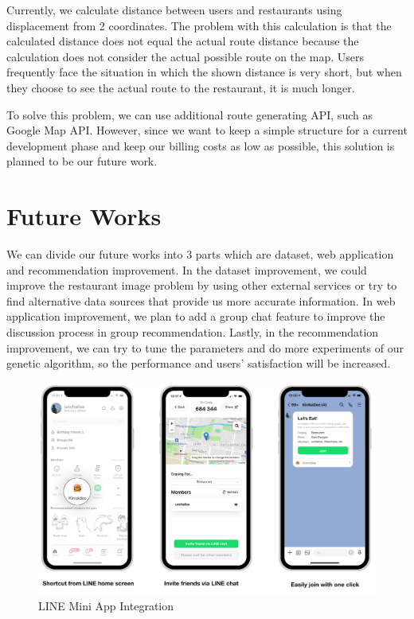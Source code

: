\documentclass[12pt,oneside,openright,a4paper]{cpe-english-project}
\begin{document}
Currently, we calculate distance between users and restaurants using displacement from 2 coordinates. The problem with this calculation is that the calculated distance does not equal the actual route distance because the calculation does not consider the actual possible route on the map. Users frequently face the situation in which the shown distance is very short, but when they choose to see the actual route to the restaurant, it is much longer.

To solve this problem, we can use additional route generating API, such as Google Map API. However, since we want to keep a simple structure for a current development phase and keep our billing costs as low as possible, this solution is planned to be our future work.

\section{Future Works}

We can divide our future works into 3 parts which are dataset, web application and recommendation improvement. In the dataset improvement, we could improve the restaurant image problem by using other external services or try to find alternative data sources that provide us more accurate information. In web application improvement, we plan to add a group chat feature to improve the discussion process in group recommendation. Lastly, in the recommendation improvement, we can try to tune the parameters and do more experiments of our genetic algorithm, so the performance and users’ satisfaction will be increased.

\begin{figure}[H]\centering
\includegraphics[width=400pt]{./images/5LINEMiniAppIntegration.png}
\caption{LINE Mini App Integration}\label{fig:5LINEMiniAppIntegration}
\end{figure}\vspace{-24pt}
\end{document}
